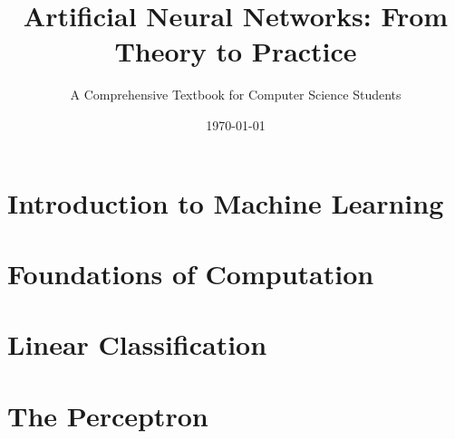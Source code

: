 \documentclass{book}
\title{Artificial Neural Networks: From Theory to Practice}
\author{A Comprehensive Textbook for Computer Science Students}
\date{\today}
\begin{document}
\maketitle
\tableofcontents

\chapter{Introduction to Machine Learning}


\chapter{Foundations of Computation}


\chapter{Linear Classification}


\chapter{The Perceptron}

\end{document}
